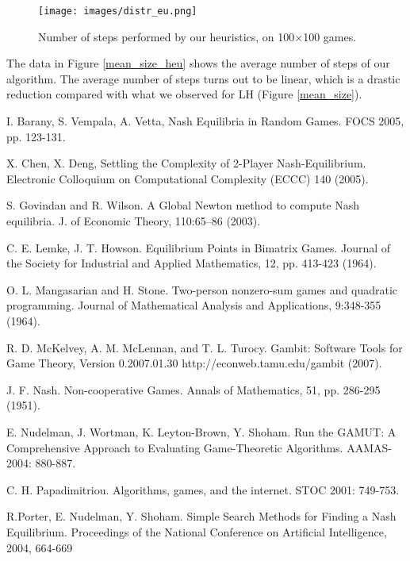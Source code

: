 \documentclass[11pt]{article}
\begin{document}
\begin{figure}[h]
\centering
\texttt{[image: images/distr\_eu.png]}
\caption{Number of steps performed by our heuristics, on
100$\times$100 games.}
\label{100all_heu}
\end{figure}

The data in Figure \ref{mean_size_heu} shows the average number of
steps of our algorithm. The average number of steps turns out to be
linear, which is a drastic reduction compared with what we observed
for LH (Figure \ref{mean_size}).

{\small
\begin{thebibliography}{99}

 I. Barany, S. Vempala, A. Vetta, Nash Equilibria
in Random Games. FOCS 2005, pp. 123-131.

 X. Chen, X. Deng, Settling the Complexity of 2-Player
Nash-Equilibrium. Electronic Colloquium on Computational Complexity
(ECCC) 140 (2005).

 S. Govindan and R. Wilson. A Global Newton method to compute Nash
equilibria. J. of Economic Theory, 110:65--86 (2003).

C. E. Lemke, J. T. Howson. Equilibrium Points in Bimatrix Games.
Journal of the Society for Industrial and Applied Mathematics, 12,
pp. 413-423 (1964).



 O. L. Mangasarian and H. Stone. Two-person nonzero-sum games and
quadratic programming. Journal of Mathematical Analysis and
Applications, 9:348-355 (1964).

R. D. McKelvey, A. M. McLennan, and T. L. Turocy.
Gambit: Software Tools for Game Theory, Version 0.2007.01.30
http://econweb.tamu.edu/gambit (2007).

J. F. Nash. Non-cooperative Games. Annals of Mathematics, 51, pp.
286-295 (1951).

E. Nudelman, J. Wortman, K. Leyton-Brown, Y. Shoham.
Run the GAMUT: A Comprehensive Approach to Evaluating Game-Theoretic Algorithms.
AAMAS-2004: 880-887.

C. H. Papadimitriou. Algorithms, games, and the internet.
STOC 2001: 749-753.

R.Porter, E. Nudelman, Y. Shoham. Simple Search Methods for Finding
a Nash Equilibrium. Proceedings of the National Conference on
Artificial Intelligence, 2004, 664-669


\end{thebibliography}}
\end{document}
